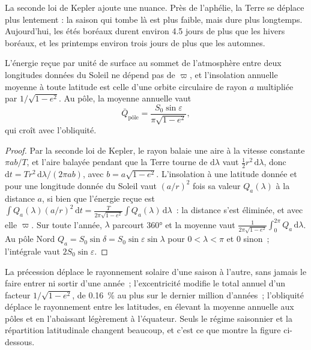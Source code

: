 La seconde loi de Kepler ajoute une nuance. Près de l'aphélie, la Terre se déplace plus lentement : la saison qui tombe là
est plus faible, mais dure plus longtemps. Aujourd'hui, les étés boréaux durent environ 4.5 jours de plus que les hivers boréaux,
et les printemps environ trois jours de plus que les automnes.

\begin{proposition}\label{prop:b2:orbital-forcing:annual}
L'énergie reçue par unité de surface au sommet de l'atmosphère entre deux longitudes données du
Soleil ne dépend pas de $\varpi$, et l'insolation annuelle moyenne à toute latitude est celle d'une orbite circulaire de rayon $a$
multipliée par $1/\sqrt{1 - e^2}$. Au pôle, la moyenne annuelle vaut
\[
  \bar Q_{\text{pôle}} = \frac{S_0\sin\varepsilon}{\pi\sqrt{1 - e^2}} ,
\]
qui croît avec l'obliquité.
\end{proposition}

\begin{proof}
Par la seconde loi de Kepler, le rayon balaie une aire à la vitesse constante $\pi ab/T$, et l'aire balayée
pendant que la Terre tourne de $\mathrm d\lambda$ vaut $\frac12 r^2\,\mathrm d\lambda$, donc $\mathrm dt =
T r^2\,\mathrm d\lambda/(2\pi ab)$, avec $b = a\sqrt{1 - e^2}$. L'insolation à une latitude donnée et pour une longitude donnée du
Soleil vaut $(a/r)^2$ fois sa valeur $Q_a(\lambda)$ à la distance $a$, si bien que
l'énergie reçue est $\int Q_a(\lambda)(a/r)^2\,\mathrm dt = \frac{T}{2\pi\sqrt{1 - e^2}}\int
Q_a(\lambda)\,\mathrm d\lambda$~: la distance s'est éliminée, et avec elle $\varpi$. Sur toute l'année,
$\lambda$ parcourt \ang{360} et la moyenne vaut $\frac{1}{2\pi\sqrt{1-e^2}}\int_0^{2\pi}
Q_a\,\mathrm d\lambda$. Au pôle Nord $Q_a = S_0\sin\delta = S_0\sin\varepsilon\sin\lambda$
pour $0 < \lambda < \pi$ et 0 sinon~; l'intégrale vaut $2S_0\sin\varepsilon$.
\end{proof}

La précession déplace le rayonnement solaire d'une saison à l'autre, sans jamais le faire entrer ni sortir d'une année~; l'excentricité
modifie le total annuel d'un facteur $1/\sqrt{1 - e^2}$, de \qty{0.16}{\percent} au plus sur le dernier million d'années~;
l'obliquité déplace le rayonnement entre les latitudes, en élevant la moyenne annuelle aux pôles et en l'abaissant
légèrement à l'équateur. Seuls le régime saisonnier et la répartition
latitudinale changent beaucoup, et c'est ce que montre la figure ci-dessous.


